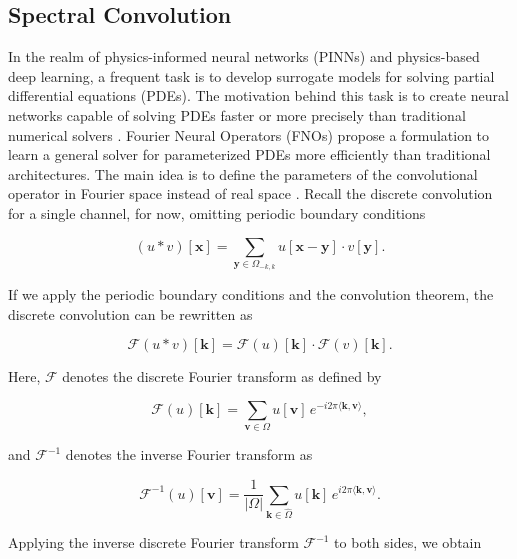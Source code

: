 \documentclass{article}
\begin{document}
\subsection{Spectral Convolution}
In the realm of physics-informed neural networks (PINNs) and physics-based deep learning, a frequent task is to develop surrogate models for solving partial differential equations (PDEs). The motivation behind this task is to create neural networks capable of solving PDEs faster or more precisely than traditional numerical solvers \citep{mcgreivy2024weak}. Fourier Neural Operators (FNOs) propose a formulation to learn a general solver for parameterized PDEs more efficiently than traditional architectures. The main idea is to define the parameters of the convolutional operator in Fourier space instead of real space \citep{li2020fourier}. Recall the discrete convolution for a single channel, for now, omitting periodic boundary conditions

\begin{equation}
    (u \ast v)[\mathbf{x}] = \sum_{\mathbf{y} \in \Omega_{-k, k}} u[\mathbf{x} - \mathbf{y}] \cdot v[\mathbf{y}].
\end{equation}

If we apply the periodic boundary conditions and the convolution theorem, the discrete convolution can be rewritten as

\begin{equation}
    \mathcal{F}(u \ast v)[\mathbf{k}] = \mathcal{F}(u)[\mathbf{k}] \cdot \mathcal{F}(v)[\mathbf{k}].
\end{equation}

Here, $\mathcal{F}$ denotes the discrete Fourier transform as defined by 

\begin{equation}
    \mathcal{F}(u)[\mathbf{k}] = \sum_{\mathbf{v} \in \Omega} u[\mathbf{v}] \, e^{-i2\pi \langle \mathbf{k}, \mathbf{v} \rangle},
\end{equation}

and $\mathcal{F}^{-1}$ denotes the inverse Fourier transform as 

\begin{equation}
    \mathcal{F}^{-1}(u)[\mathbf{v}] = \frac{1}{|\Omega|} \sum_{\mathbf{k} \in \hat{\Omega}} u[\mathbf{k}] \, e^{i2\pi \langle \mathbf{k}, \mathbf{v} \rangle}.
\end{equation}

Applying the inverse discrete Fourier transform \(\mathcal{F}^{-1}\) to both sides, we obtain
\end{document}
